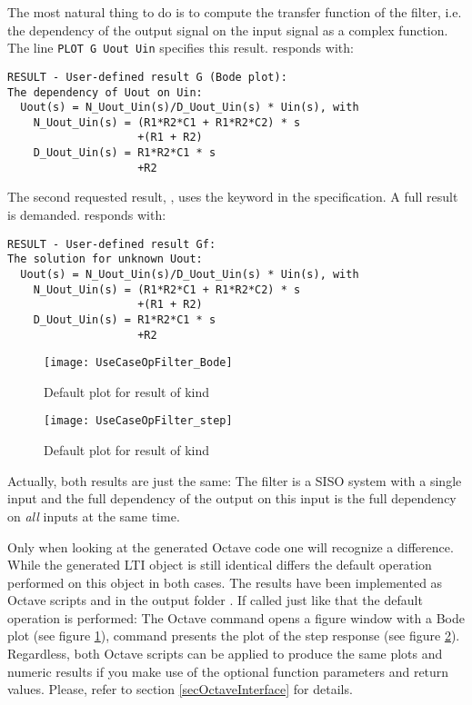 The most natural thing to do is to compute the transfer function of the
filter, i.e. the dependency of the output signal on the input signal as a
complex function. The line \verb+PLOT G Uout Uin+ specifies this result.
\linnet{} responds with:
\begin{verbatim}
RESULT - User-defined result G (Bode plot):
The dependency of Uout on Uin:
  Uout(s) = N_Uout_Uin(s)/D_Uout_Uin(s) * Uin(s), with
    N_Uout_Uin(s) = (R1*R2*C1 + R1*R2*C2) * s
                    +(R1 + R2)
    D_Uout_Uin(s) = R1*R2*C1 * s
                    +R2
\end{verbatim}

The second requested result, , uses the keyword  in
the specification. A full result is demanded. \linnet{} responds with:
\begin{verbatim}
RESULT - User-defined result Gf:
The solution for unknown Uout:
  Uout(s) = N_Uout_Uin(s)/D_Uout_Uin(s) * Uin(s), with
    N_Uout_Uin(s) = (R1*R2*C1 + R1*R2*C2) * s
                    +(R1 + R2)
    D_Uout_Uin(s) = R1*R2*C1 * s
                    +R2
\end{verbatim}

\begin{figure}
\begin{center}
\texttt{[image: UseCaseOpFilter\_Bode]}
\caption{Default plot for \linnet{} result of kind }
\label{figUseCaseOpFilter_Bode}
\end{center}
\end{figure}

\begin{figure}
\begin{center}
\texttt{[image: UseCaseOpFilter\_step]}
\caption{Default plot for \linnet{} result of kind }
\label{figUseCaseOpFilter_step}
\end{center}
\end{figure}

Actually, both results are just the same: The filter is a SISO system with
a single input and the full dependency of the output on this input is the
full dependency on \emph{all} inputs at the same time.

Only when looking at the generated Octave code one will recognize a
difference. While the generated LTI object is still identical differs the
default operation performed on this object in both cases. The results have
been implemented as Octave scripts  and  in the
output folder . If called just like that the default
operation is performed: The Octave command  opens a figure window
with a Bode plot (see figure \ref{figUseCaseOpFilter_Bode}), command
 presents the plot of the step response (see figure
\ref{figUseCaseOpFilter_step}). Regardless, both Octave scripts can be
applied to produce the same plots and numeric results if you make use of
the optional function parameters and return values. Please, refer to
section \ref{secOctaveInterface} for details.


